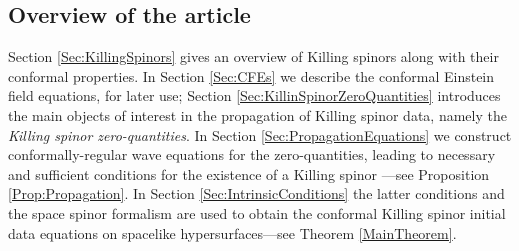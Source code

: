 \documentclass[10pt,a4paper]{article}
\theoremstyle{plain}
\begin{document}
\subsection*{Overview of the article}
Section \ref{Sec:KillingSpinors} gives  an overview of Killing
spinors along with their conformal properties. In Section
\ref{Sec:CFEs} we describe the conformal Einstein
field equations, for later use; Section
\ref{Sec:KillinSpinorZeroQuantities} introduces the main objects of
interest in the propagation of Killing spinor data, namely the
\emph{Killing spinor zero-quantities}. In Section
\ref{Sec:PropagationEquations} we construct conformally-regular wave
equations for the zero-quantities, leading to necessary and sufficient
conditions for the existence of a Killing spinor ---see Proposition
\ref{Prop:Propagation}. In Section \ref{Sec:IntrinsicConditions} the
latter conditions and the space spinor formalism are used to obtain 
the conformal Killing spinor initial data equations
 on spacelike hypersurfaces---see
 Theorem \ref{MainTheorem}.
\end{document}
